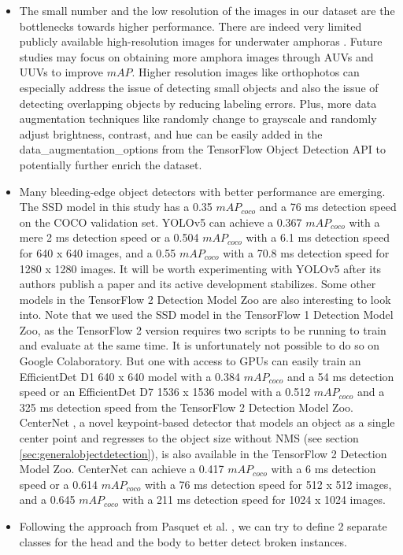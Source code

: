 \documentclass[a4paper, 11pt, oneside]{article}
\begin{document}
\begin{itemize}
  \item The small number and the low resolution of the images in our dataset are the bottlenecks towards higher
  performance. There are indeed very limited publicly available high-resolution images for underwater amphoras
  \cite{pasquet2017amphora}. Future studies may focus on obtaining more amphora images through AUVs and UUVs to improve
  $mAP$. Higher resolution images like orthophotos can especially address the issue of detecting
  small objects \cite{kisantal2019augmentation} and also the issue of detecting overlapping objects by reducing labeling
  errors. Plus, more data augmentation techniques like randomly change to grayscale and randomly adjust brightness,
  contrast, and hue can be easily added in the data\_augmentation\_options from the TensorFlow Object Detection API
  to potentially further enrich the dataset.
  \item Many bleeding-edge object detectors with better performance are emerging. The SSD model in this study
  has a 0.35 $mAP_{coco}$ and a 76 ms detection speed on the COCO validation set. YOLOv5 can achieve a 0.367
  $mAP_{coco}$ with a mere 2 ms detection speed or a 0.504 $mAP_{coco}$ with a 6.1 ms detection speed for 640 x 640 images,
  and a 0.55 $mAP_{coco}$ with a 70.8 ms detection speed for 1280 x 1280 images. It will be worth experimenting with
  YOLOv5 after its authors publish a paper and its active development stabilizes. Some other models in the TensorFlow 2
  Detection Model Zoo \cite{tf2detectionmodelzoo} are also interesting to look into. Note that we used the SSD
  model in the TensorFlow 1 Detection Model Zoo, as the TensorFlow 2 version requires two scripts to be running
  to train and evaluate at the same time. It is unfortunately not possible to do so on Google Colaboratory. But one with
  access to GPUs can easily train an EfficientDet \cite{tan2020efficientdet} D1 640 x 640 model with a 0.384 $mAP_{coco}$
  and a 54 ms detection speed or an EfficientDet D7 1536 x 1536 model with a 0.512 $mAP_{coco}$ and a 325 ms detection
  speed from the TensorFlow 2 Detection Model Zoo. CenterNet \cite{zhou2019objects}, a novel keypoint-based detector that
  models an object as a single center point and regresses to the object size without NMS
  (see section \ref{sec:generalobjectdetection}), is also available in the TensorFlow 2 Detection Model Zoo. CenterNet
  can achieve a 0.417 $mAP_{coco}$ with a 6 ms detection speed or a 0.614 $mAP_{coco}$ with a 76 ms detection
  speed for 512 x 512 images, and a 0.645 $mAP_{coco}$ with a 211 ms detection speed for 1024 x 1024 images.
  \item Following the approach from Pasquet et al. \cite{pasquet2017amphora}, we can try to define 2 separate classes
  for the head and the body to better detect broken instances.
\end{itemize}

\newpage

\printbibliography
\end{document}
